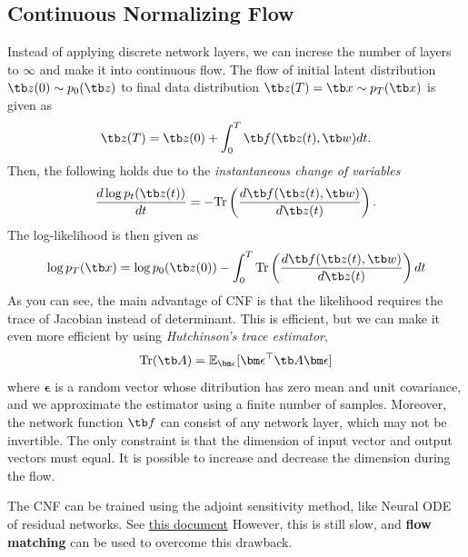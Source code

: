 \documentclass{article}
\begin{document}
    \subsection{Continuous Normalizing Flow}
        Instead of applying discrete network layers, we can increse the number of layers to $\infty$ and make it into continuous flow.
        The flow of initial latent distribution $\tb z(0) \sim p_0(\tb z)$ to final data distribution $\tb z(T) = \tb x \sim p_T(\tb x)$ is given as
        \[
        \tb z(T) = \tb z(0) + \int_{0}^{T}\tb f(\tb z(t), \tb w)dt.
        \]
        Then, the following holds due to the \emph{instantaneous change of variables}
        \[
        \frac{d\log{p_t(\tb z(t))}}{dt} = -\text{Tr}\left( \frac{d\tb f(\tb z(t), \tb w)}{d\tb z(t)} \right).
        \]
        The log-likelihood is then given as
        \[
        \log{p_T(\tb x)}=\log{p_0(\tb z(0))}-\int_{0}^{T}\text{Tr}\left( \frac{d\tb f(\tb z(t), \tb w)}{d\tb z(t)} \right)dt
        \]
        As you can see, the main advantage of CNF is that the likelihood requires the trace of Jacobian instead of determinant.
        This is efficient, but we can make it even more efficient by using \emph{Hutchinson's trace estimator},
        \[
        \text{Tr}(\tb A) = \mathbb{E}_{\bm\epsilon}[\bm\epsilon^\top\tb A \bm\epsilon]
        \]
        where $\bm\epsilon$ is a random vector whose ditribution has zero mean and unit covariance,
        and we approximate the estimator using a finite number of samples.
        Moreover, the network function $\tb f$ can consist of any network layer, which may not be invertible.
        The only constraint is that the dimension of input vector and output vectors must equal. It is possible to increase and decrease the dimension during the flow.

        The CNF can be trained using the adjoint sensitivity method, like Neural ODE of residual networks. See \href{run:../residual_connection/residual_connection.pdf}{this document}
        However, this is still slow, and \textbf{flow matching} can be used to overcome this drawback.
\end{document}
